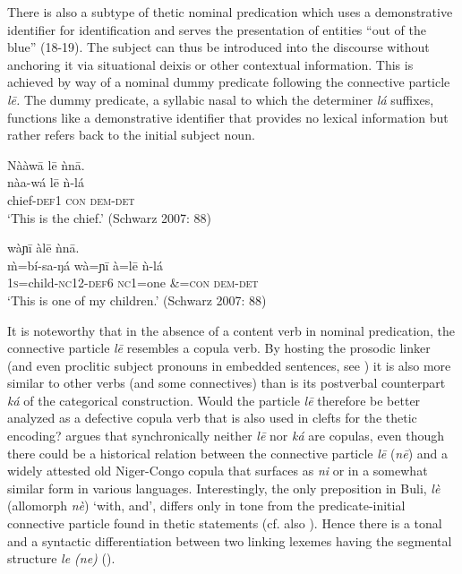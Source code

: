 \documentclass[output=paper]{langsci/langscibook}
\begin{document}
There is also a subtype of thetic nominal predication which uses a demonstrative identifier for identification and serves the presentation of entities “out of the blue” (18-19). The subject can thus be introduced into the discourse without anchoring it via situational deixis or other contextual information. This is achieved by way of a nominal dummy predicate following the connective particle \textit{l\={e}.} The dummy predicate, a syllabic nasal to which the determiner \textit{lá} suffixes, functions like a demonstrative identifier that provides no lexical information but rather refers back to the initial subject noun.

\ea\label{ex:schwarz:18}
\glll   Nààw\={a}    l\={e}  ǹn\={a}.\\
    \textup{nàa-wá}    l\={e}  {ǹ-lá}\\
       chief-\textsc{def1}  \textsc{con}  \textsc{dem}-\textsc{det}\\
\glt ‘This is the chief.’ (Schwarz 2007: 88)
\z

\ea\label{ex:schwarz:19}
    wàɲ\={i}    àl\={e}    ǹn\={a}.\\
    \textup{\`{m}=bí-sa-ŋá}    wà=ɲ\={i}    à=l\={e}    {ǹ-lá}\\
       1\textsc{s}=child-\textsc{nc}12-\textsc{def}6  \textsc{nc}1=one  \&=\textsc{con}  \textsc{dem-det}\\
\glt ‘This is one of my children.’ (Schwarz 2007: 88)
\z

It is noteworthy that in the absence of a content verb in nominal predication, the connective particle \textit{l\={e}} resembles a copula verb. By hosting the prosodic linker (and even proclitic subject pronouns in embedded sentences, see ) it is also more similar to other verbs (and some connectives) than is its postverbal counterpart \textit{ká} of the categorical construction. Would the particle \textit{l\={e}} therefore be better analyzed as a defective copula verb that is also used in clefts for the thetic encoding? \citet{Schwarz2009} argues that synchronically neither \textit{l\={e}} nor \textit{ká} are copulas, even though there could be a historical relation between the connective particle \textit{l\={e}} (\textit{n\={e}}) and a widely attested old Niger-Congo copula that surfaces as \textit{ni} or in a somewhat similar form in various languages. Interestingly, the only preposition in Buli, \textit{lè} (allomorph \textit{nè}) ‘with, and’, differs only in tone from the predicate-initial connective particle found in thetic statements (cf. also \citealt{Schwarz2010a}). Hence there is a tonal and a syntactic differentiation between two linking lexemes having the segmental structure \textit{le (ne)} ().
\end{document}
